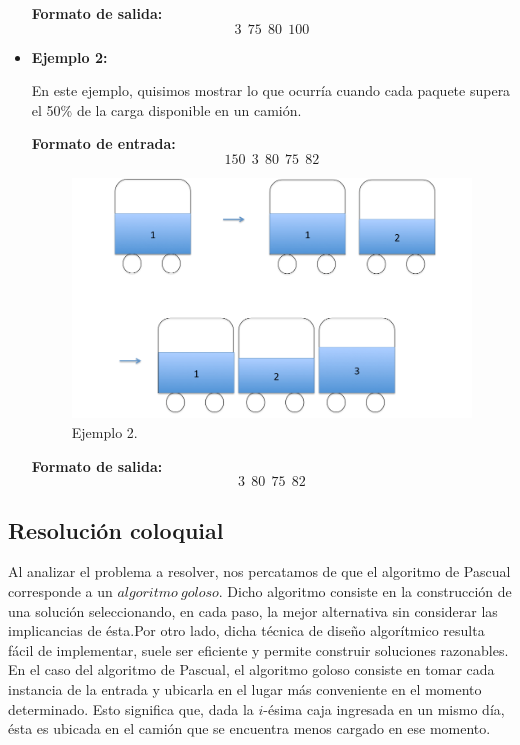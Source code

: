 \begin{itemize}
\textbf{Formato de salida:}
$$3\ \ 75\ \ 80\ \ 100$$


\item {\large{\textbf{Ejemplo 2:}}}\newline

En este ejemplo, quisimos mostrar lo que ocurría cuando cada paquete supera el 50\% de la carga disponible en un camión.\newline

\textbf{Formato de entrada:} 
$$150\ \ 3\ \ 80\ \ 75\ \ 82$$

\begin{figure}[H] %
\begin{center}
\includegraphics[width=300pt]{../imgs/ejemplo2.jpg}
\caption{Ejemplo 2.}
\end{center}
\end{figure}

\textbf{Formato de salida:}
$$3\ \ 80\ \ 75\ \ 82$$


\end{itemize}
\subsection{Resolución coloquial}
Al analizar el problema a resolver, nos percatamos de que el algoritmo de Pascual corresponde a un $algoritmo\ goloso$. Dicho algoritmo consiste en la construcción de una solución seleccionando, en cada paso, la mejor alternativa sin considerar las implicancias de ésta.\newline Por otro lado, dicha técnica de diseño algorítmico resulta fácil de implementar, suele ser eficiente y permite construir soluciones razonables.\newline
\newline
En el caso del algoritmo de Pascual, el algoritmo goloso consiste en tomar cada instancia de la entrada y ubicarla en el lugar más conveniente en el momento determinado. Esto significa que, dada la $i$-ésima caja ingresada en un mismo día, ésta es ubicada en el camión que se encuentra menos cargado en ese momento.\newline

